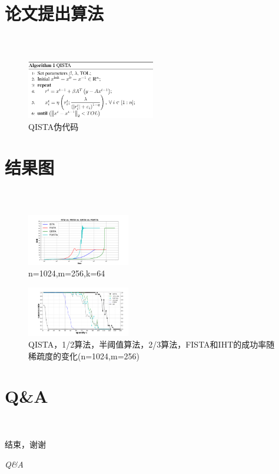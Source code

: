 \documentclass[compress]{beamer}%
\begin{document}
\section{论文提出算法}
\begin{frame}
\frametitle{\secname~ }
\begin{figure}[b]
	\centering
	\includegraphics[width=0.5\textwidth]{4.png}
	\caption{QISTA伪代码}
\end{figure}

\end{frame}
\section{结果图}
\begin{frame}
	\frametitle{\secname~ }
\begin{figure}[b]
	\centering
	\includegraphics[width=0.4\textwidth]{n-m-k=1024-256-64-mean.png}
	\caption{n=1024,m=256,k=64}
\end{figure}
\begin{figure}[b]
	\centering
	\includegraphics[width=0.4\textwidth]{5.png}
	\caption{QISTA，1/2算法，半阈值算法，2/3算法，FISTA和IHT的成功率随稀疏度的变化(n=1024,m=256)}
\end{figure}
\end{frame}
\section{Q\&A}
\begin{frame}{\secname~ }
	\begin{center}
 		\huge {\kaishu 结束，谢谢}
		
		\huge \textit {Q\&A}
	\end{center}
\end{frame}
\end{document}
